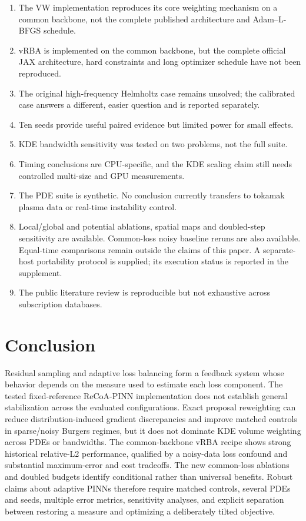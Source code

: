 \documentclass[
  11pt,
]{article}
\providecommand{\tightlist}{%
  \setlength{\itemsep}{0pt}\setlength{\parskip}{0pt}}
\begin{document}
\begin{enumerate}
\def\labelenumi{\arabic{enumi}.}
\tightlist
\item
  The VW implementation reproduces its core weighting mechanism on a
  common backbone, not the complete published architecture and
  Adam--L-BFGS schedule.
\item
  vRBA is implemented on the common backbone, but the complete official
  JAX architecture, hard constraints and long optimizer schedule have
  not been reproduced.
\item
  The original high-frequency Helmholtz case remains unsolved; the
  calibrated case answers a different, easier question and is reported
  separately.
\item
  Ten seeds provide useful paired evidence but limited power for small
  effects.
\item
  KDE bandwidth sensitivity was tested on two problems, not the full
  suite.
\item
  Timing conclusions are CPU-specific, and the KDE scaling claim still
  needs controlled multi-size and GPU measurements.
\item
  The PDE suite is synthetic. No conclusion currently transfers to
  tokamak plasma data or real-time instability control.
\item
  Local/global and potential ablations, spatial maps and doubled-step
  sensitivity are available. Common-loss noisy baseline reruns are also
  available. Equal-time comparisons remain outside the claims of this
  paper. A separate-host portability protocol is supplied; its execution
  status is reported in the supplement.
\item
  The public literature review is reproducible but not exhaustive across
  subscription databases.
\end{enumerate}

\hypertarget{conclusion}{%
\section{Conclusion}\label{conclusion}}

Residual sampling and adaptive loss balancing form a feedback system
whose behavior depends on the measure used to estimate each loss
component. The tested fixed-reference ReCoA-PINN implementation does not
establish general stabilization across the evaluated configurations.
Exact proposal reweighting can reduce distribution-induced gradient
discrepancies and improve matched controls in sparse/noisy Burgers
regimes, but it does not dominate KDE volume weighting across PDEs or
bandwidths. The common-backbone vRBA recipe shows strong historical
relative-L2 performance, qualified by a noisy-data loss confound and
substantial maximum-error and cost tradeoffs. The new common-loss
ablations and doubled budgets identify conditional rather than universal
benefits. Robust claims about adaptive PINNs therefore require matched
controls, several PDEs and seeds, multiple error metrics, sensitivity
analyses, and explicit separation between restoring a measure and
optimizing a deliberately tilted objective.
\end{document}
